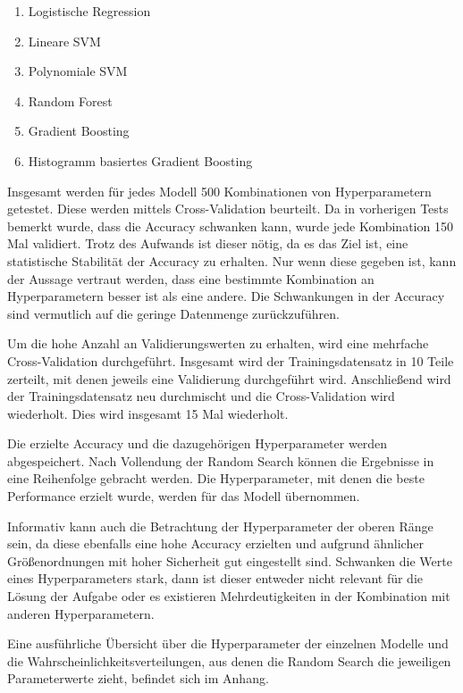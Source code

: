 \begin{enumerate}
    \item Logistische Regression
    \item Lineare SVM
    \item Polynomiale SVM
    \item Random Forest
    \item Gradient Boosting
    \item Histogramm basiertes Gradient Boosting
\end{enumerate}

Insgesamt werden für jedes Modell 500 Kombinationen von Hyperparametern getestet. Diese werden mittels Cross-Validation beurteilt. Da in vorherigen Tests bemerkt wurde, dass die Accuracy schwanken kann, wurde jede Kombination 150 Mal validiert. Trotz des Aufwands ist dieser nötig, da es das Ziel ist, eine statistische Stabilität der Accuracy zu erhalten. Nur wenn diese gegeben ist, kann der Aussage vertraut werden, dass eine bestimmte Kombination an Hyperparametern besser ist als eine andere. Die Schwankungen in der Accuracy sind vermutlich auf die geringe Datenmenge zurückzuführen. \par

Um die hohe Anzahl an Validierungswerten zu erhalten, wird eine mehrfache Cross-Validation durchgeführt. Insgesamt wird der Trainingsdatensatz in 10 Teile zerteilt, mit denen jeweils eine Validierung durchgeführt wird. Anschließend wird der Trainingsdatensatz neu durchmischt und die Cross-Validation wird wiederholt. Dies wird insgesamt 15 Mal wiederholt. \par

Die erzielte Accuracy und die dazugehörigen Hyperparameter werden abgespeichert. Nach Vollendung der Random Search können die Ergebnisse in eine Reihenfolge gebracht werden. Die Hyperparameter, mit denen die beste Performance erzielt wurde, werden für das Modell übernommen. \par

Informativ kann auch die Betrachtung der Hyperparameter der oberen Ränge sein, da diese ebenfalls eine hohe Accuracy erzielten und aufgrund ähnlicher Größenordnungen mit hoher Sicherheit gut eingestellt sind. Schwanken die Werte eines Hyperparameters stark, dann ist dieser entweder nicht relevant für die Lösung der Aufgabe oder es existieren Mehrdeutigkeiten in der Kombination mit anderen Hyperparametern. \par

Eine ausführliche Übersicht über die Hyperparameter der einzelnen Modelle und die Wahrscheinlichkeitsverteilungen, aus denen die Random Search die jeweiligen Parameterwerte zieht, befindet sich im Anhang. 

